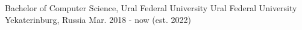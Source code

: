 

\begin{cventries}

  \cventry
    {Bachelor of Computer Science, Ural Federal University} %
    {Ural Federal University} %
    {Yekaterinburg, Russia} %
    {Mar. 2018 - now (est. 2022)} %
    {
    }
\end{cventries}
